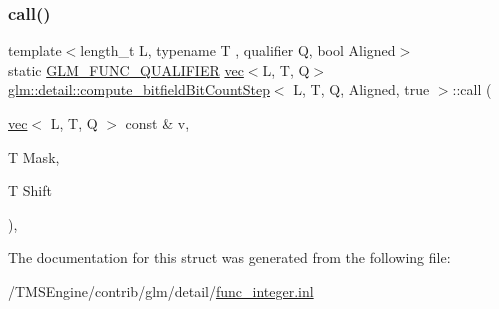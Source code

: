 \subsubsection{\texorpdfstring{call()}{call()}}
{\footnotesize\ttfamily template$<$length\+\_\+t L, typename T , qualifier Q, bool Aligned$>$ \\
static \hyperlink{setup_8hpp_a33fdea6f91c5f834105f7415e2a64407}{G\+L\+M\+\_\+\+F\+U\+N\+C\+\_\+\+Q\+U\+A\+L\+I\+F\+I\+ER} \hyperlink{structglm_1_1vec}{vec}$<$L, T, Q$>$ \hyperlink{structglm_1_1detail_1_1compute__bitfield_bit_count_step}{glm\+::detail\+::compute\+\_\+bitfield\+Bit\+Count\+Step}$<$ L, T, Q, Aligned, true $>$\+::call (\begin{DoxyParamCaption}\item[{\hyperlink{structglm_1_1vec}{vec}$<$ L, T, Q $>$ const \&}]{v,  }\item[{T}]{Mask,  }\item[{T}]{Shift }\end{DoxyParamCaption})\hspace{0.3cm}{\ttfamily [inline]}, {\ttfamily [static]}}



The documentation for this struct was generated from the following file\+:\begin{DoxyCompactItemize}
\item 
/\+T\+M\+S\+Engine/contrib/glm/detail/\hyperlink{func__integer_8inl}{func\+\_\+integer.\+inl}\end{DoxyCompactItemize}
